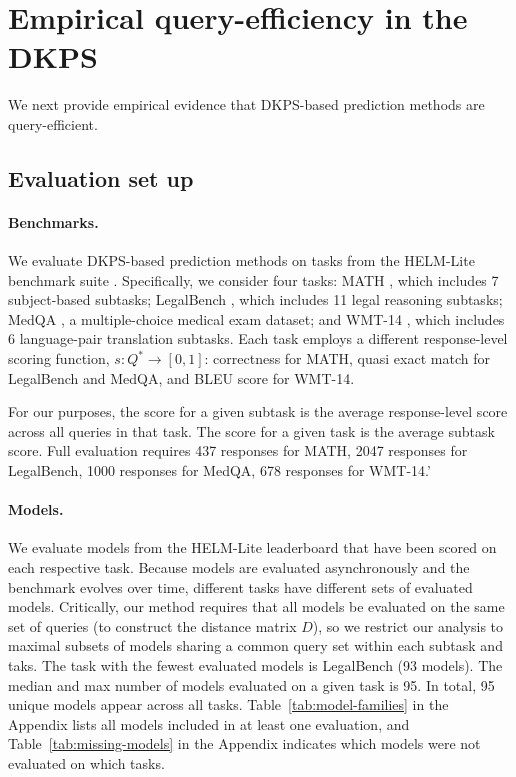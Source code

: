 \section{Empirical query-efficiency in the DKPS}
\label{sec:query-efficiency}
We next provide empirical evidence that DKPS-based prediction methods are query-efficient.
\subsection{Evaluation set up}
\label{sec:data-description}
\paragraph{Benchmarks.} 
We evaluate DKPS-based prediction methods on tasks from the HELM-Lite benchmark suite \citep{liang2022holistic}.
Specifically, we consider four tasks: MATH \citep{hendrycksmath2021}, which includes 7 subject-based subtasks; LegalBench \citep{guha2023legalbenchcollaborativelybuiltbenchmark}, which includes 11 legal reasoning subtasks; MedQA \citep{jin2020disease}, a multiple-choice medical exam dataset; and WMT-14 \citep{bojar-etal-2014-findings}, which includes 6 language-pair translation subtasks.
Each task employs a different response-level scoring function, $ s: Q^{*} \to [0,1] $: correctness for MATH, quasi exact match for LegalBench and MedQA, and BLEU score for WMT-14.

For our purposes, the score for a given subtask is the average response-level score across all queries in that task.
The score for a given task is the average subtask score.
Full evaluation requires 437 responses for MATH, 2047 responses for LegalBench, 1000 responses for MedQA, 678 responses for WMT-14.'

\paragraph{Models.}
We evaluate models from the HELM-Lite leaderboard that have been scored on each respective task.
Because models are evaluated asynchronously and the benchmark evolves over time, different tasks have different sets of evaluated models.
Critically, our method requires that all models be evaluated on the same set of queries (to construct the distance matrix $D$), so we restrict our analysis to maximal subsets of models sharing a common query set within each subtask and taks.
The task with the fewest evaluated models is LegalBench (93 models).
The median and max number of models evaluated on a given task is 95.
In total, 95 unique models appear across all tasks.
Table~\ref{tab:model-families} in the Appendix lists all models included in at least one evaluation, and Table~\ref{tab:missing-models} in the Appendix indicates which models were not evaluated on which tasks.

